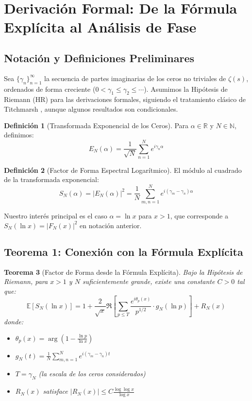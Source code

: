 \documentclass[12pt, a4paper]{article}
\theoremstyle{plain}
\newtheorem{teorema}{Teorema}[section]
\theoremstyle{definition}
\newtheorem{definicion}[teorema]{Definición}
\begin{document}
\section{Derivación Formal: De la Fórmula Explícita al Análisis de Fase}

\subsection{Notación y Definiciones Preliminares}

Sea $\{\gamma_n\}_{n=1}^\infty$ la secuencia de partes imaginarias de los ceros no triviales de $\zeta(s)$, ordenados de forma creciente ($0 < \gamma_1 \leq \gamma_2 \leq \cdots$). Asumimos la Hipótesis de Riemann (HR) para las derivaciones formales, siguiendo el tratamiento clásico de Titchmarsh \cite{titchmarsh1986}, aunque algunos resultados son condicionales.

\begin{definicion}[Transformada Exponencial de los Ceros]
Para $\alpha \in \mathbb{R}$ y $N \in \mathbb{N}$, definimos:
\[
E_N(\alpha) = \frac{1}{\sqrt{N}} \sum_{n=1}^N e^{i\gamma_n \alpha}
\]
\end{definicion}

\begin{definicion}[Factor de Forma Espectral Logarítmico]
El módulo al cuadrado de la transformada exponencial:
\[
S_N(\alpha) = |E_N(\alpha)|^2 = \frac{1}{N} \sum_{m,n=1}^N e^{i(\gamma_m - \gamma_n)\alpha}
\]
\end{definicion}

Nuestro interés principal es el caso $\alpha = \ln x$ para $x > 1$, que corresponde a $S_N(\ln x) = |F_N(x)|^2$ en notación anterior.

\subsection{Teorema 1: Conexión con la Fórmula Explícita}

\begin{teorema}[Factor de Forma desde la Fórmula Explícita]
\label{teo:factor_forma_explicita}
Bajo la Hipótesis de Riemann, para $x > 1$ y $N$ suficientemente grande, existe una constante $C > 0$ tal que:
\[
\mathbb{E}[S_N(\ln x)] = 1 + \frac{2}{\sqrt{x}} \Re\left[ \sum_{p \leq T} \frac{e^{i\theta_p(x)}}{p^{1/2}} \cdot g_N(\ln p) \right] + R_N(x)
\]
donde:
\begin{itemize}
    \item $\theta_p(x) = \arg\left(1 - \frac{\ln p}{\ln x}\right)$
    \item $g_N(t) = \frac{1}{N} \sum_{m,n=1}^N e^{i(\gamma_m - \gamma_n)t}$
    \item $T = \gamma_N$ (la escala de los ceros considerados)
    \item $R_N(x)$ satisface $|R_N(x)| \leq C \frac{\log\log x}{\log x}$
\end{itemize}
\end{teorema}
\end{document}
